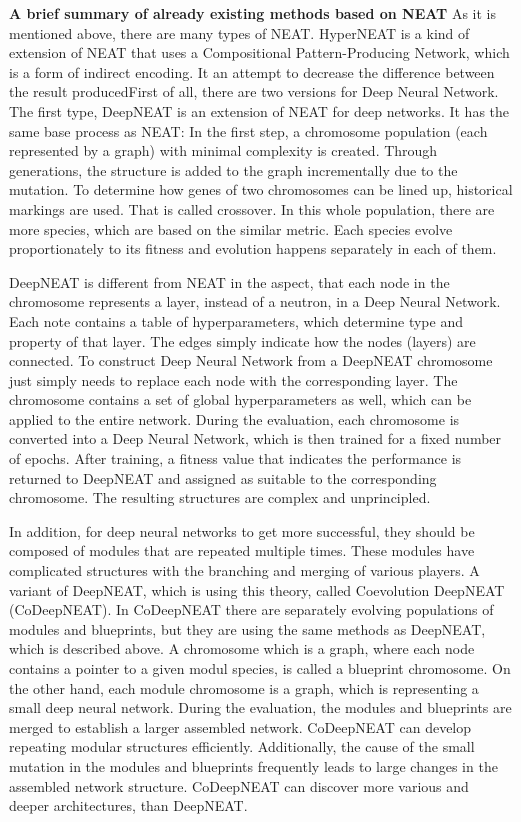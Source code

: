 \documentclass[lettersize,journal]{IEEEtran}
\begin{document}
        \textbf{A brief summary of already existing methods based on NEAT}
        As it is mentioned above, there are many types of NEAT. HyperNEAT is a kind of extension of NEAT that uses a Compositional Pattern-Producing Network, which is a form of indirect encoding. It an attempt to decrease the difference between the result producedFirst of all, there are two versions for Deep Neural Network. The first type, DeepNEAT is an extension of NEAT for deep networks. It has the same base process as NEAT: In the first step, a chromosome population (each represented by a graph) with minimal complexity is created. Through generations, the structure is added to the graph incrementally due to the mutation. To determine how genes of two chromosomes can be lined up, historical markings are used. That is called crossover. In this whole population, there are more species, which are based on the similar metric. Each species evolve proportionately to its fitness and evolution happens separately in each of them.
        
        DeepNEAT is different from NEAT in the aspect, that each node in the chromosome represents a layer, instead of a neutron, in a Deep Neural Network. Each note contains a table of hyperparameters, which determine  type and property of that layer. The edges simply indicate how the nodes (layers) are connected. To construct Deep Neural Network from a DeepNEAT chromosome just simply needs to replace each node with the corresponding layer. The chromosome contains a set of global hyperparameters as well, which can be applied to the entire network. During the evaluation, each chromosome is converted into a Deep Neural Network, which is then trained for a fixed number of epochs. After training, a fitness value that indicates the performance is returned to DeepNEAT and assigned as suitable to the corresponding chromosome. The resulting structures are complex and unprincipled. 
        
        In addition, for deep neural networks to get more successful, they should be composed of modules that are repeated multiple times. These modules have complicated structures with the branching and merging of various players. A variant of DeepNEAT, which is using this theory, called Coevolution DeepNEAT (CoDeepNEAT). In CoDeepNEAT there are separately evolving populations of modules and blueprints, but they are using the same methods as DeepNEAT, which is described above. A chromosome which is a graph, where each node contains a pointer to a given modul species, is called a blueprint chromosome. On the other hand, each module chromosome is a graph, which is representing a small deep neural network. During the evaluation, the modules and blueprints are merged to establish a larger assembled network. CoDeepNEAT can develop repeating modular structures efficiently. Additionally, the cause of the small mutation in the modules and blueprints frequently leads to large changes in the assembled network structure. CoDeepNEAT can discover more various and deeper architectures, than DeepNEAT.
        
\end{document}
